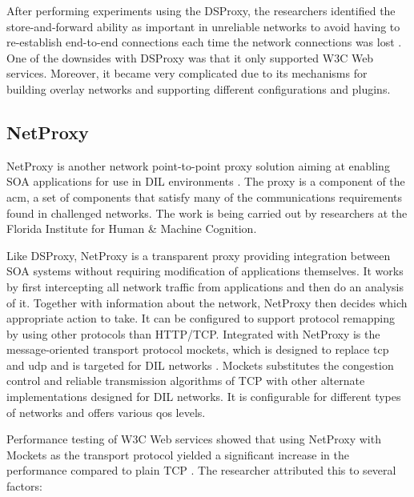 After performing experiments using the DSProxy, the researchers identified the
store-and-forward ability as important in unreliable networks to avoid having to
re-establish end-to-end connections each time the network connections was lost
\cite{dsproxy-ffi}. One of the downsides with DSProxy was that it only supported
W3C Web services. Moreover, it became very complicated due to its mechanisms for
building overlay networks and supporting different configurations and plugins.

\subsection{NetProxy}

NetProxy is another network point-to-point proxy solution aiming at enabling SOA
applications for use in DIL environments \cite{suri-netproxy}. The proxy is a
component of the \gls{acm}, a set of components that satisfy many of the
communications requirements found in challenged networks. The work is being
carried out by researchers at the Florida Institute for Human \& Machine
Cognition.

Like DSProxy, NetProxy is a transparent proxy providing integration between SOA
systems without requiring modification of applications themselves. It works by
first intercepting all network traffic from applications and then do an analysis
of it. Together with information about the network, NetProxy then decides which
appropriate action to take. It can be configured to support protocol remapping
by using other protocols than HTTP/TCP. Integrated with NetProxy is the
message-oriented transport protocol \gls{mockets}, which is designed to replace
\gls{tcp} and \gls{udp} and is targeted for DIL networks \cite{suri-netproxy}.
Mockets substitutes the congestion control and reliable transmission algorithms
of TCP with other alternate implementations designed for DIL networks. It is
configurable for different types of networks and offers various \gls{qos}
levels.

Performance testing of W3C Web services showed that using NetProxy with Mockets as
the transport protocol yielded a significant increase in the performance
compared to plain TCP \cite{suri-netproxy}. The researcher attributed this to
several factors:

